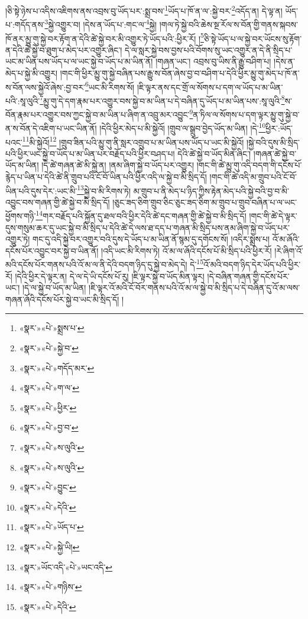 །ཅི་སྟེ་ཉེས་པ་འདིས་འཇིགས་ནས་འབྲས་བུ་ཡོད་པར་:སྨྲ་བས་\footnote{«སྣར་»«པེ་»སྨྲས་པ་}ཡོད་པ་ཁོ་ན་ལ་:སྐྱེ་བར་\footnote{«སྣར་»«པེ་»སྐྱེ་བ་}འདོད་ན། དེ་ལྟ་ན། ཡོད་པ་:གདོད་ནས་\footnote{«སྣར་»«པེ་»གདོད་མར་}སྐྱེ་འགྱུར་བ། །དེས་ན་ཡོད་པ་:གང་ལ་\footnote{«སྣར་»«པེ་»ག་ལ་}སྐྱེ། །གལ་ཏེ་སྐྱེ་བའི་ཆེས་སྔ་རོལ་ས་བོན་གྱི་གནས་སྐབས་ཁོ་ནར་མྱུ་གུ་སྐྱེ་བར་རྟོག་ན་དེའི་ཚེ་སྐྱེ་བར་མི་འགྱུར་ཏེ་ཡོད་པའི་:ཕྱིར་རོ། །\footnote{«སྣར་»«པེ་»ཕྱིར་}ཅི་སྟེ་ཡོད་པ་ལ་སྐྱེ་བར་ཡོངས་སུ་རྟོག་ན་དེའི་ཚེ་སྐྱེ་བ་ཐུག་པ་མེད་པར་འགྱུར་ཞིང་། དེ་ལ་སླར་སྐྱེ་བས་བྱས་པའི་བོགས་སུ་ཡང་འགྱུར་ན་དེ་ནི་སྲིད་པ་ཡང་མ་ཡིན་པས་ཡོད་པ་ལ་ཡང་སྐྱེ་བ་ཡོད་པ་མ་ཡིན་ནོ། །གཞན་ཡང་། འབྲས་བུ་ཡིས་ནི་རྒྱུ་བཤིག་པ། །དེས་ན་མེད་པ་སྐྱེ་མི་འགྱུར། །གང་གི་ཕྱིར་མྱུ་གུ་སྐྱེ་བཞིན་པས་རྒྱུ་ས་བོན་ཞེས་བྱ་བ་བཤིག་པ་དེའི་ཕྱིར་མྱུ་གུ་མེད་པ་ཁོ་ན་ས་བོན་ལས་སྐྱེའོ་ཞེས་:བྱ་བར་\footnote{«སྣར་»«པེ་»བྱ་བ་}ཡང་མི་རིགས་སོ། །ཇི་ལྟར་ནས་དང་གྲོ་ལ་སོགས་པ་དག་ལ་ཡོད་པ་མ་ཡིན་པའི་:སཱ་ལུའི་\footnote{«སྣར་»«པེ་»ས་ལུའི་}མྱུ་གུ་དེ་དག་རྣམ་པར་འགྱུར་བས་སྐྱེ་བ་མ་ཡིན་པ་དེ་བཞིན་དུ་ཡོད་པ་མ་ཡིན་པས་:སཱ་ལུའི་\footnote{«སྣར་»«པེ་»ས་ལུའི་}ས་བོན་རྣམ་པར་འགྱུར་བས་ཀྱང་སྐྱེ་བ་མ་ཡིན་པ་ཞིག་ན་འབྲུ་མར་འབྱུང་\footnote{«སྣར་»«པེ་»བྱུང་}ན་ཏིལ་ལ་སོགས་པ་དག་ལྟར་མྱུ་གུ་སྐྱེ་བ་ན་ས་བོན་དེ་འཇིག་པ་ཡང་ཡིན་ནོ། །དེའི་ཕྱིར་མེད་པ་མི་སྐྱེའོ། །གྲུབ་ལ་སྒྲུབ་བྱེད་ཡོད་མ་ཡིན། །དེ་\footnote{«སྣར་»«པེ་»དེའི་}ཕྱིར་:ཡོད་པའང་\footnote{«སྣར་»«པེ་»ཡོད་པ་}མི་སྐྱེའོ།\footnote{«སྣར་»«པེ་»སྐྱེ་ཡི།} །གྲུབ་ཟིན་པའི་མྱུ་གུ་ནི་སླར་འགྲུབ་པ་མ་ཡིན་པས་ཡོད་པ་ཡང་མི་སྐྱེའོ། །སྐྱེ་བའི་དུས་མི་སྲིད་པའི་ཕྱིར་ཡང་སྐྱེ་བ་ཡོད་པ་མ་ཡིན་པར་བརྗོད་པའི་ཕྱིར་བཤད་པ། དེའི་ཚེ་སྐྱེ་བ་ཡོད་མིན་ཞིང་། །གཞན་ཚེ་སྐྱེ་བ་ཡོད་མ་ཡིན། །དེ་ཚེ་གཞན་ཚེ་མི་སྐྱེ་ན། །ནམ་ཞིག་སྐྱེ་བ་ཡོད་པར་འགྱུར། །གང་གི་ཚེ་མྱུ་གུ་འདི་བདག་གི་དངོས་པོ་རྙེད་པ་ཡིན་པ་དེའི་ཚེ་ནི་གྲུབ་པའི་ངོ་བོ་ཡིན་པའི་ཕྱིར་འདི་ལ་སྐྱེ་བ་མི་སྲིད་དོ། །གང་གི་ཚེ་འདི་མ་གྲུབ་པའི་ངོ་བོ་ཡིན་པའི་དུས་དེར་:ཡང་མི་\footnote{«སྣར་»ཡོང་འདི་«པེ་»ཡང་འདི་}སྐྱེ་བ་མི་རིགས་ཏེ། མ་གྲུབ་པ་ནི་མེད་པ་ཉིད་ཀྱིས་རྟེན་མེད་པའི་སྐྱེ་བའི་བྱ་བ་མི་འབྱུང་བས་གཞན་གྱི་ཚེ་སྐྱེ་བ་མི་སྲིད་དོ། །ཅུང་ཟད་ཅིག་གྲུབ་ཅིང་ཅུང་ཟད་ཅིག་མ་གྲུབ་པ་གྲུབ་བཞིན་པ་ལ་ཡང་ཕྱོགས་གཉི་\footnote{«སྣར་»«པེ་»གཉིས་}གར་བརྗོད་པའི་སྐྱོན་དུ་ཐལ་བའི་ཕྱིར་དེའི་ཚེ་དང་གཞན་གྱི་ཚེ་སྐྱེ་བ་མི་སྲིད་དོ། །གང་གི་ཚེ་དེ་ལྟར་དུས་གསུམ་ཆར་དུ་ཡང་སྐྱེ་བ་མི་སྲིད་པ་དེའི་ཚེ་དེ་ལས་ཐ་དད་པ་གཞན་མི་སྲིད་པས་ནམ་ཞིག་སྐྱེ་བ་ཡོད་པར་འགྱུར་ཏེ། གང་དུ་འདི་སྐྱེ་བར་འགྱུར་བའི་དུས་དེ་ཡོད་པ་མ་ཡིན་ནོ་སྙམ་དུ་དགོངས་སོ། །འདིར་སྨྲས་པ། འོ་མ་ཞོའི་དངོས་པོར་འབྱུང་བར་སྐྱེ་བ་ཡིན་ནོ། །འདི་ཡང་མི་རིགས་ཏེ། འོ་མ་ལ་ཞོའི་དངོས་པོ་མི་སྲིད་པའི་ཕྱིར་རོ། །རེ་ཞིག་འོ་མའི་དངོས་པོར་གནས་པའི་འོ་མ་ལ་ནི་དེའི་བདག་ཉིད་དུ་སྐྱེ་བ་མེད་དེ། དེ་\footnote{«སྣར་»«པེ་»དེའི་}འོ་མའི་བདག་ཉིད་དེར་ཡོད་པའི་ཕྱིར་རོ། །དེའི་ཕྱིར་དེ་ལྟར་ན། དེ་ལ་དེ་ཡི་དངོས་པོ་རུ། །ཇི་ལྟར་སྐྱེ་བ་ཡོད་མིན་ལྟར། །དེ་བཞིན་གཞན་གྱི་དངོས་པོར་ཡང་། །དེ་ལ་སྐྱེ་བ་ཡོད་མ་ཡིན། །ཇི་ལྟར་འོ་མའི་ངོ་བོར་གནས་པའི་འོ་མ་ལ་སྐྱེ་བ་མི་སྲིད་པ་དེ་བཞིན་དུ་འོ་མ་ལས་གཞན་ཞོའི་དངོས་པོར་སྐྱེ་བ་ཡང་མི་སྲིད་དོ། །
